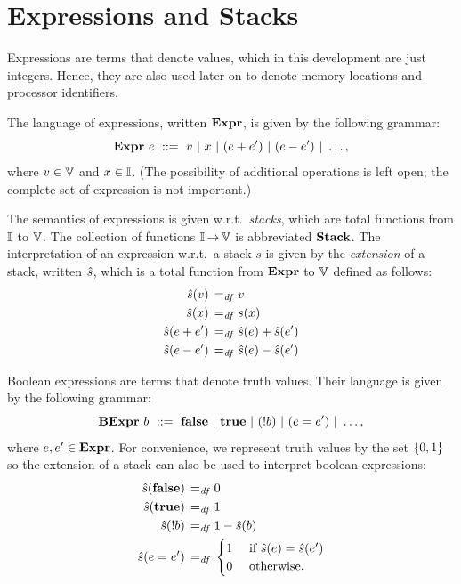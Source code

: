 \documentclass[11pt]{report}
\begin{document}
\section{Expressions and Stacks}
\label{sec:expressions}

Expressions are terms that denote values, which in this development are just integers. Hence, they are also used later on to denote memory locations and processor identifiers. 

The language of expressions, written $\mathbf{Expr}$, is given by the following grammar: \[ \mathbf{Expr}~e ~::=~ v ~|~ x ~|~ (e + e') ~|~ (e - e') ~|~ \ldots, \] where $v \in \mathbb{V}$ and $x \in \mathbb{I}$. (The possibility of additional operations is left open; the complete set of expression is not important.)

The semantics of expressions is given w.r.t.~\emph{stacks}, which are total functions from $\mathbb{I}$ to $\mathbb{V}$. The collection of functions $\mathbb{I} \operatorname{\rightarrow} \mathbb{V}$ is abbreviated $\mathbf{Stack}$. The interpretation of an expression w.r.t.~a stack $s$ is given by the \emph{extension} of a stack, written $\hat{s}$, which is a total function from $\mathbf{Expr}$ to $\mathbb{V}$ defined as follows: \begin{align*}
    \hat{s}(v) \operatorname{\;=_{\mathit{df}}\;} & v \\
    \hat{s}(x) \operatorname{\;=_{\mathit{df}}\;} & s(x) \\
    \hat{s}(e + e') \operatorname{\;=_{\mathit{df}}\;} & \hat{s}(e) + \hat{s}(e') \\
    \hat{s}(e - e') \operatorname{\;=_{\mathit{df}}\;} & \hat{s}(e) - \hat{s}(e')
\end{align*}  

Boolean expressions are terms that denote truth values. Their language is given by the following grammar: \[ \mathbf{BExpr}~b ~::=~ \mathbf{false} ~|~ \mathbf{true} ~|~ (!b) ~|~ (e = e') ~|~ \ldots, \] where $e,e' \in \mathbf{Expr}$. For convenience, we represent truth values by the set $\left\lbrace 0,1 \right\rbrace$ so the extension of a stack can also be used to interpret boolean expressions: \begin{align*}
    \hat{s}(\mathbf{false}) \operatorname{\;=_{\mathit{df}}\;} & 0 \\
    \hat{s}(\mathbf{true}) \operatorname{\;=_{\mathit{df}}\;} & 1 \\
    \hat{s}(!b) \operatorname{\;=_{\mathit{df}}\;} & 1 - \hat{s}(b) \\
    \hat{s}(e = e') \operatorname{\;=_{\mathit{df}}\;} & \begin{cases}
        1 &\text{ if } \hat{s}(e) = \hat{s}(e')\\
        0 &\text{ otherwise.}
    \end{cases}
\end{align*}
\end{document}
